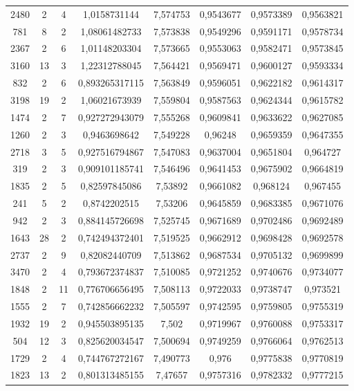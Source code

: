 \begin{longtable}{|c|c|c|c|c|c|c|c|}
2480 & 2 & 4 & 1,0158731144 & 7,574753 & 0,9543677 & 0,9573389 & 0,9563821 \\
781 & 8 & 2 & 1,08061482733 & 7,573838 & 0,9549296 & 0,9591171 & 0,9578734 \\
2367 & 2 & 6 & 1,01148203304 & 7,573665 & 0,9553063 & 0,9582471 & 0,9573845 \\
3160 & 13 & 3 & 1,22312788045 & 7,564421 & 0,9569471 & 0,9600127 & 0,9593334 \\
832 & 2 & 6 & 0,893265317115 & 7,563849 & 0,9596051 & 0,9622182 & 0,9614317 \\
3198 & 19 & 2 & 1,06021673939 & 7,559804 & 0,9587563 & 0,9624344 & 0,9615782 \\
1474 & 2 & 7 & 0,927272943079 & 7,555268 & 0,9609841 & 0,9633622 & 0,9627085 \\
1260 & 2 & 3 & 0,9463698642 & 7,549228 & 0,96248 & 0,9659359 & 0,9647355 \\
2718 & 3 & 5 & 0,927516794867 & 7,547083 & 0,9637004 & 0,9651804 & 0,964727 \\
319 & 2 & 3 & 0,909101185741 & 7,546496 & 0,9641453 & 0,9675902 & 0,9664819 \\
1835 & 2 & 5 & 0,82597845086 & 7,53892 & 0,9661082 & 0,968124 & 0,967455 \\
241 & 5 & 2 & 0,8742202515 & 7,53206 & 0,9645859 & 0,9683385 & 0,9671076 \\
942 & 2 & 3 & 0,884145726698 & 7,525745 & 0,9671689 & 0,9702486 & 0,9692489 \\
1643 & 28 & 2 & 0,742494372401 & 7,519525 & 0,9662912 & 0,9698428 & 0,9692578 \\
2737 & 2 & 9 & 0,82082440709 & 7,513862 & 0,9687534 & 0,9705132 & 0,9699899 \\
3470 & 2 & 4 & 0,793672374837 & 7,510085 & 0,9721252 & 0,9740676 & 0,9734077 \\
1848 & 2 & 11 & 0,776706656495 & 7,508113 & 0,9722033 & 0,9738747 & 0,973521 \\
1555 & 2 & 7 & 0,742856662232 & 7,505597 & 0,9742595 & 0,9759805 & 0,9755319 \\
1932 & 19 & 2 & 0,945503895135 & 7,502 & 0,9719967 & 0,9760088 & 0,9753317 \\
504 & 12 & 3 & 0,825620034547 & 7,500694 & 0,9749259 & 0,9766064 & 0,9762513 \\
1729 & 2 & 4 & 0,744767272167 & 7,490773 & 0,976 & 0,9775838 & 0,9770819 \\
1823 & 13 & 2 & 0,801313485155 & 7,47657 & 0,9757316 & 0,9782332 & 0,9777215 \\

\end{longtable}
